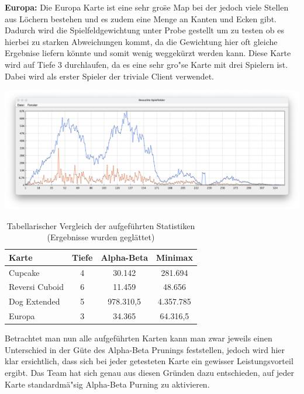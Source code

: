 \textbf{Europa:}
Die Europa Karte ist eine sehr gro\"se Map bei der jedoch viele Stellen aus L\"ochern bestehen und es zudem eine Menge an Kanten und Ecken gibt.
Dadurch wird die Spielfeldgewichtung unter Probe gestellt um zu testen ob es hierbei zu starken Abweichungen kommt, da die Gewichtung hier oft gleiche Ergebnise liefern k\"onnte und somit wenig weggek\"urzt werden kann.
Diese Karte wird auf Tiefe 3 durchlaufen, da es eine sehr gro"se Karte mit drei Spielern ist.
Dabei wird als erster Spieler der triviale Client verwendet.

\begin{minipage}{\linewidth}
    \centering
    \includegraphics[width=0.9\linewidth]{statistic/EUROPA-02/ST-01-D3-LD}
    \label{fig:statistic-graph-europa}
\end{minipage}
\vspace{1em}

\vspace{1em}
\begin{table}[!h]
    \centering
    \begin{tabular}{|l|c|c|c|}
        \hline
        \textbf{Karte} & \textbf{Tiefe} & \textbf{Alpha-Beta} & \textbf{Minimax}\\
        \hline
        Cupcake & 4 & 30.142 & 281.694\\
        \hline
        Reversi Cuboid & 6 & 11.459 & 48.656\\
        \hline
        Dog Extended & 5 & 978.310,5 & 4.357.785\\
        \hline
        Europa & 3 & 34.365 & 64.316,5\\
        \hline
    \end{tabular}
    \caption{Tabellarischer Vergleich der aufgef\"uhrten Statistiken (Ergebnisse wurden gegl\"attet)}
    \label{tab:additional-search-depth}
\end{table}
\vspace{1em}

Betrachtet man nun alle aufgef\"uhrten Karten kann man zwar jeweils einen Unterschied in der G\"ute des Alpha-Beta Prunings feststellen, jedoch wird hier klar ersichtlich, dass sich bei jeder getesteten Karte ein gewisser Leistungsvorteil ergibt.
Das Team hat sich genau aus diesen Gr\"unden dazu entschieden, auf jeder Karte standardm\"a"sig Alpha-Beta Purning zu aktivieren.

